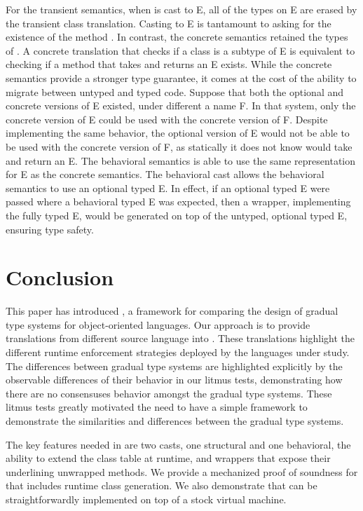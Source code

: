 \documentclass[USenglish]{tex/lipics-v2016}
\begin{document}
For the transient semantics, when \x is cast to {\xt E}, all of the types on
{\xt E} are erased by the transient class translation. Casting to {\xt E} is
tantamount to asking for the existence of the method \m. In contrast, the
concrete semantics retained the types of \m. A concrete translation that
checks if a class is a subtype of {\xt E} is equivalent to checking if a
method \m that takes and returns an {\xt E} exists.  While the concrete
semantics provide a stronger type guarantee, it comes at the cost of the
ability to migrate between untyped and typed code. Suppose that both the
optional and concrete versions of {\xt E} existed, under different a name
{\xt F}. In that system, only the concrete version of {\xt E} could be used
with the concrete version of {\xt F}. Despite implementing the same
behavior, the optional version of {\xt E} would not be able to be used with
the concrete version of {\xt F}, as statically it does not know \m would
take and return an {\xt E}.  The behavioral semantics is able to use the
same representation for {\xt E} as the concrete semantics. The behavioral
cast allows the behavioral semantics to use an optional typed {\xt E}. In
effect, if an optional typed {\xt E} were passed where a behavioral typed
{\xt E} was expected, then a wrapper, implementing the fully typed {\xt E},
would be generated on top of the untyped, optional typed {\xt E}, ensuring
type safety.

\section{Conclusion}\label{litm}

This paper has introduced \kafka, a framework for comparing the design of
gradual type systems for object-oriented languages. Our approach is to
provide translations from different source language into \kafka. These
translations highlight the different runtime enforcement strategies deployed
by the languages under study. The differences between gradual type systems
are highlighted explicitly by the observable differences of their behavior in
our litmus tests, demonstrating how there are no consensuses behavior amongst the
gradual type systems. These litmus tests greatly motivated  the need to have
a simple framework to demonstrate the similarities and differences between
the gradual type systems.

The key features needed in \kafka are two casts, one structural and one
behavioral, the ability to extend the class table at runtime, and 
wrappers that expose their underlining unwrapped methods.  We provide a
mechanized proof of soundness for \kafka that includes runtime class
generation.  We also demonstrate that \kafka can be straightforwardly
implemented on top of a stock virtual machine.
\end{document}

